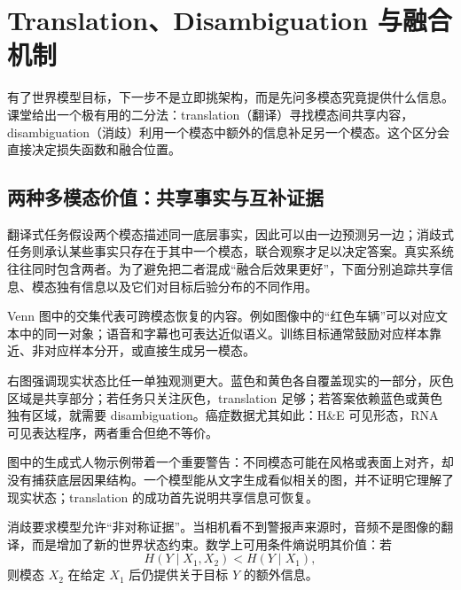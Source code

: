 \section{Translation、Disambiguation 与融合机制}

有了世界模型目标，下一步不是立即挑架构，而是先问多模态究竟提供什么信息。课堂给出一个极有用的二分法：translation（翻译）寻找模态间共享内容，disambiguation（消歧）利用一个模态中额外的信息补足另一个模态。这个区分会直接决定损失函数和融合位置。

\subsection{两种多模态价值：共享事实与互补证据}

翻译式任务假设两个模态描述同一底层事实，因此可以由一边预测另一边；消歧式任务则承认某些事实只存在于其中一个模态，联合观察才足以决定答案。真实系统往往同时包含两者。为了避免把二者混成“融合后效果更好”，下面分别追踪共享信息、模态独有信息以及它们对目标后验分布的不同作用。


Venn 图中的交集代表可跨模态恢复的内容。例如图像中的“红色车辆”可以对应文本中的同一对象；语音和字幕也可表达近似语义。训练目标通常鼓励对应样本靠近、非对应样本分开，或直接生成另一模态。


右图强调现实状态比任一单独观测更大。蓝色和黄色各自覆盖现实的一部分，灰色区域是共享部分；若任务只关注灰色，translation 足够；若答案依赖蓝色或黄色独有区域，就需要 disambiguation。癌症数据尤其如此：H\&E 可见形态，RNA 可见表达程序，两者重合但绝不等价。


图中的生成式人物示例带着一个重要警告：不同模态可能在风格或表面上对齐，却没有捕获底层因果结构。一个模型能从文字生成看似相关的图，并不证明它理解了现实状态；translation 的成功首先说明共享信息可恢复。


消歧要求模型允许“非对称证据”。当相机看不到警报声来源时，音频不是图像的翻译，而是增加了新的世界状态约束。数学上可用条件熵说明其价值：若
\[
H(Y\mid X_1,X_2)<H(Y\mid X_1),
\]
则模态 $X_2$ 在给定 $X_1$ 后仍提供关于目标 $Y$ 的额外信息。

